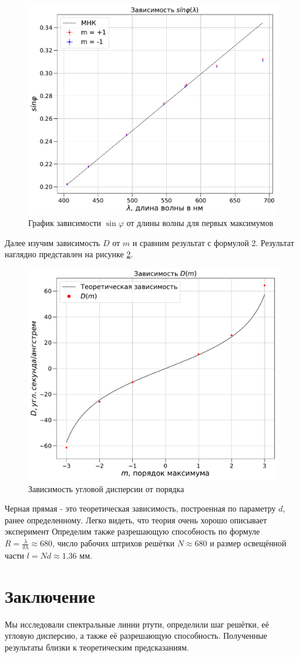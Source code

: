 \begin{figure}[H]
    \centering
    \includegraphics[scale=0.45]{sin.pdf}
    \caption{График зависимости $\sin \varphi$ от длины волны для первых максимумов}
    \label{angle}
\end{figure}
\n
Далее изучим зависимость $D$ от $m$ и сравним результат с формулой 2. Результат наглядно представлен на рисунке \ref{D}.

\begin{figure}[H]
    \centering
    \includegraphics[scale=0.45]{D.pdf}
    \caption{\centering Зависимость угловой дисперсии от порядка}
    \label{D}
\end{figure}
\n
Черная прямая - это теоретическая зависимость, построенная по параметру $d$, ранее определенному. Легко видеть, что теория очень хорошо описывает эксперимент
\n
Определим также разрешающую способность по формуле $\displaystyle R = \frac{\lambda}{\delta \lambda} \approx 680$, число рабочих штрихов решётки $N \approx 680$ и размер освещённой части $l = Nd \approx 1.36$ мм.

\section*{Заключение}

Мы исследовали спектральные линии ртути, определили шаг решётки, её угловую дисперсию, а также её разрешающую способность. Полученные результаты близки к теоретическим предсказаниям.


